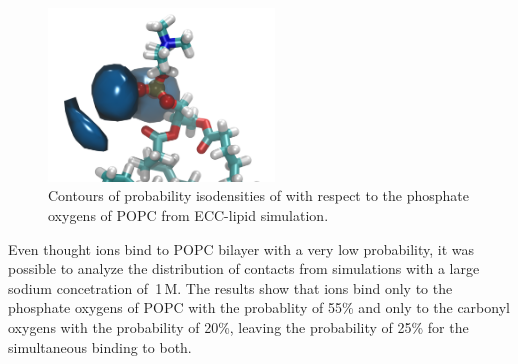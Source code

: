 \documentclass[aip,jcp,twocolumn]{revtex4}
\begin{document}
\begin{figure}[tbp]
  \centering
  \includegraphics[width=6.0cm]{../Fig/volmap_resid10_Ca_Cl_PO4Cent.png} %
  \caption{\label{fig:volmaps}
      Contours of probability isodensities of  with respect to 
      the phosphate oxygens of POPC from ECC-lipid simulation.
  }
\end{figure}

Even thought  ions bind to POPC bilayer with a very low probability,
it was possible to analyze the distribution of contacts from simulations with a large
sodium concetration of~1\,M.
The results show that  ions bind only to the phosphate oxygens 
of POPC with the probablity of 55\% and only to the carbonyl oxygens with the
probability of 20\%, leaving the probability of 25\% for the
simultaneous binding to both.%
\end{document}
